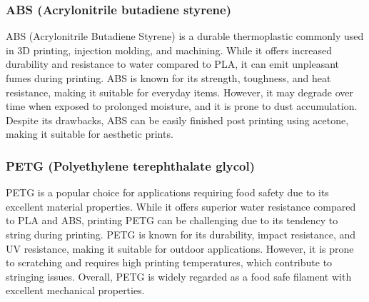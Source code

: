 \documentclass[class=report,11pt,crop=false]{standalone}
\begin{document}
\subsubsection{ABS (Acrylonitrile butadiene styrene)}
ABS (Acrylonitrile Butadiene Styrene) is a durable thermoplastic commonly used in 3D printing, injection molding, and machining. While it offers increased durability and resistance to water compared to PLA, it can emit unpleasant fumes during printing. ABS is known for its strength, toughness, and heat resistance, making it suitable for everyday items. However, it may degrade over time when exposed to prolonged moisture, and it is prone to dust accumulation. Despite its drawbacks, ABS can be easily finished post printing using acetone, making it suitable for aesthetic prints.
\newline

\subsubsection{PETG (Polyethylene terephthalate glycol)}
PETG is a popular choice for applications requiring food safety due to its excellent material properties. While it offers superior water resistance compared to PLA and ABS, printing PETG can be challenging due to its tendency to string during printing. PETG is known for its durability, impact resistance, and UV resistance, making it suitable for outdoor applications. However, it is prone to scratching and requires high printing temperatures, which contribute to stringing issues. Overall, PETG is widely regarded as a food safe filament with excellent mechanical properties.
\newline
\end{document}
